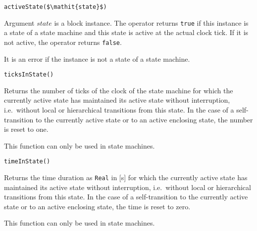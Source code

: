 \begin{operatordefinition}[activeState]
\begin{synopsis}\begin{lstlisting}
activeState($\mathit{state}$)
\end{lstlisting}\end{synopsis}
\begin{semantics}
Argument $\mathit{state}$ is a block instance.  The operator returns \lstinline!true! if this instance is a state of a state machine and this state is active at the actual clock tick.  If it is not active, the operator returns \lstinline!false!.

It is an error if the instance is not a state of a state machine.
\end{semantics}
\end{operatordefinition}

\begin{operatordefinition}[ticksInState]
\begin{synopsis}\begin{lstlisting}
ticksInState()
\end{lstlisting}\end{synopsis}
\begin{semantics}
Returns the number of ticks of the clock of the state machine for which the currently active state has maintained its active state without interruption, i.e.\ without local or hierarchical transitions from this state.  In the case of a self-transition to the currently active state or to an active enclosing state, the number is reset to one.

This function can only be used in state machines.
\end{semantics}
\end{operatordefinition}

\begin{operatordefinition}[timeInState]
\begin{synopsis}\begin{lstlisting}
timeInState()
\end{lstlisting}\end{synopsis}
\begin{semantics}
Returns the time duration as \lstinline!Real! in {[}s{]} for which the currently active state has maintained its active state without interruption, i.e.\ without local or hierarchical transitions from this state. In the case of a self-transition to the currently active state or to an active enclosing state, the time is reset to zero.

This function can only be used in state machines.
\end{semantics}
\end{operatordefinition}

